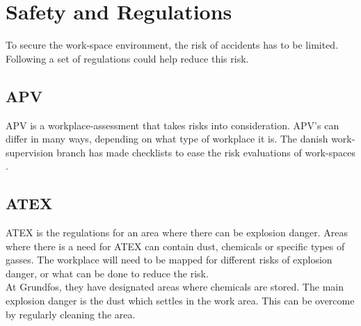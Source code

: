 \section{Safety and Regulations}\label{ch:regulation}
To secure the work-space environment, the risk of accidents has to be limited. Following a set of regulations could help reduce this risk.\\ 

\subsection{APV}
APV is a workplace-assessment that takes risks into consideration. APV's can differ in many ways, depending on what type of workplace it is. The danish work-supervision branch has made checklists to ease the risk evaluations of work-spaces \cite{Apv}\cite{Risikovurdering}.\\


\subsection{ATEX}
ATEX is the regulations for an area where there can be explosion danger. Areas where there is a need for ATEX can contain dust, chemicals or specific types of gasses. The workplace will need to be mapped for different risks of explosion danger, or what can be done to reduce the risk.\\ 
At Grundfos, they have designated areas where chemicals are stored. The main explosion danger is the dust which settles in the work area. This can be overcome by regularly cleaning the area\cite{ATEX}.  

